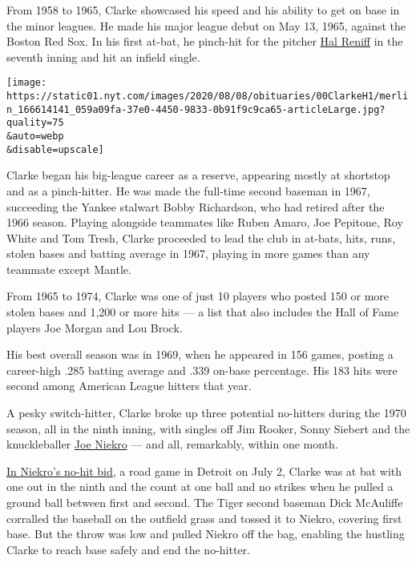 From 1958 to 1965, Clarke showcased his speed and his ability to get on
base in the minor leagues. He made his major league debut on May 13,
1965, against the Boston Red Sox. In his first at-bat, he pinch-hit for
the pitcher
\href{https://fritzpetersondotorg.wordpress.com/2015/07/02/remembering-hal-reniff-on-his-birthday/}{Hal
Reniff} in the seventh inning and hit an infield single.

\texttt{[image: https://static01.nyt.com/images/2020/08/08/obituaries/00ClarkeH1/merlin\_166614141\_059a09fa-37e0-4450-9833-0b91f9c9ca65-articleLarge.jpg?quality=75\\\&auto=webp\\\&disable=upscale]}

Clarke began his big-league career as a reserve, appearing mostly at
shortstop and as a pinch-hitter. He was made the full-time second
baseman in 1967, succeeding the Yankee stalwart Bobby Richardson, who
had retired after the 1966 season. Playing alongside teammates like
Ruben Amaro, Joe Pepitone, Roy White and Tom Tresh, Clarke proceeded to
lead the club in at-bats, hits, runs, stolen bases and batting average
in 1967, playing in more games than any teammate except Mantle.

From 1965 to 1974, Clarke was one of just 10 players who posted 150 or
more stolen bases and 1,200 or more hits --- a list that also includes
the Hall of Fame players Joe Morgan and Lou Brock.

His best overall season was in 1969, when he appeared in 156 games,
posting a career-high .285 batting average and .339 on-base percentage.
His 183 hits were second among American League hitters that year.

A pesky switch-hitter, Clarke broke up three potential no-hitters during
the 1970 season, all in the ninth inning, with singles off Jim Rooker,
Sonny Siebert and the knuckleballer
\href{https://www.nytimes.com/2006/10/29/sports/baseball/29niekro.html\#:~:text=He\%20was\%2061.,aneurysm\%2C\%20the\%20news\%20agency\%20reported.}{Joe
Niekro} --- and all, remarkably, within one month.

\href{https://www.nytimes.com/1970/07/03/archives/clarke-foils-bid-on-one0ut-single-breaks-up-nohitter-for-3d-time-in.html}{In
Niekro's no-hit bid}, a road game in Detroit on July 2, Clarke was at
bat with one out in the ninth and the count at one ball and no strikes
when he pulled a ground ball between first and second. The Tiger second
baseman Dick McAuliffe corralled the baseball on the outfield grass and
tossed it to Niekro, covering first base. But the throw was low and
pulled Niekro off the bag, enabling the hustling Clarke to reach base
safely and end the no-hitter.

